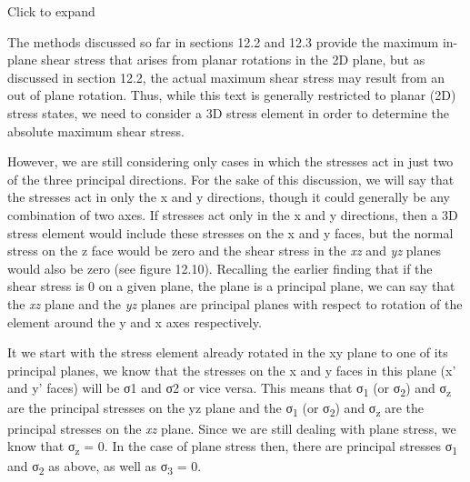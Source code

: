 \documentclass[
  letterpaper,
  DIV=11,
  numbers=noendperiod]{scrreprt}
\theoremstyle{definition}
\theoremstyle{remark}
\begin{document}
Click to expand

The methods discussed so far in sections 12.2 and 12.3 provide the
maximum in-plane shear stress that arises from planar rotations in the
2D plane, but as discussed in section 12.2, the actual maximum shear
stress may result from an out of plane rotation. Thus, while this text
is generally restricted to planar (2D) stress states, we need to
consider a 3D stress element in order to determine the absolute maximum
shear stress.

However, we are still considering only cases in which the stresses act
in just two of the three principal directions. For the sake of this
discussion, we will say that the stresses act in only the x and y
directions, though it could generally be any combination of two axes. If
stresses act only in the x and y directions, then a 3D stress element
would include these stresses on the x and y faces, but the normal stress
on the z face would be zero and the shear stress in the \emph{xz} and
\emph{yz} planes would also be zero (see figure 12.10). Recalling the
earlier finding that if the shear stress is 0 on a given plane, the
plane is a principal plane, we can say that the \emph{xz} plane and the
\emph{yz} planes are principal planes with respect to rotation of the
element around the y and x axes respectively.

It we start with the stress element already rotated in the xy plane to
one of its principal planes, we know that the stresses on the x and y
faces in this plane (x' and y' faces) will be σ1 and σ2 or vice versa.
This means that σ\textsubscript{1} (or σ\textsubscript{2}) and
σ\textsubscript{z} are the principal stresses on the yz plane and the
σ\textsubscript{1} (or σ\textsubscript{2}) and σ\textsubscript{z} are
the principal stresses on the \emph{xz} plane. Since we are still
dealing with plane stress, we know that σ\textsubscript{z} = 0. In the
case of plane stress then, there are principal stresses
σ\textsubscript{1} and σ\textsubscript{2} as above, as well as
σ\textsubscript{3} = 0.
\end{document}
